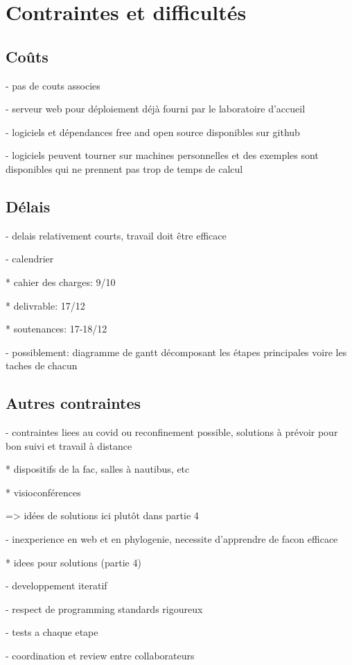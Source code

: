 \section{Contraintes et difficultés}

\subsection{Coûts}

- pas de couts associes

- serveur web pour déploiement déjà fourni par le laboratoire d'accueil

- logiciels et dépendances free and open source disponibles sur github

- logiciels peuvent tourner sur machines personnelles et des exemples sont disponibles qui ne prennent pas trop de temps de calcul

\subsection{Délais}

- delais relativement courts, travail doit être efficace

- calendrier

	* cahier des charges: 9/10

	* delivrable: 17/12

	* soutenances: 17-18/12

- possiblement: diagramme de gantt décomposant les étapes principales voire les taches de chacun

\subsection{Autres contraintes}

- contraintes liees au covid ou reconfinement possible, solutions à prévoir pour bon suivi et travail à distance

	* dispositifs de la fac, salles à nautibus, etc

	* visioconférences

	=> idées de solutions ici plutôt dans partie 4

- inexperience en web et en phylogenie, necessite d'apprendre de facon efficace

	* idees pour solutions (partie 4)

		- developpement iteratif

		- respect de programming standards rigoureux

		- tests a chaque etape

		- coordination et review entre collaborateurs
